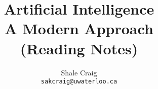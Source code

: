 \ifdefined\isphone
  
\else
  
\fi




\title{Artificial Intelligence \\ A Modern Approach \\ (Reading Notes)}

\author{
    Shale Craig\\
    \texttt{sakcraig@uwaterloo.ca}
}

\maketitle

\tableofcontents





